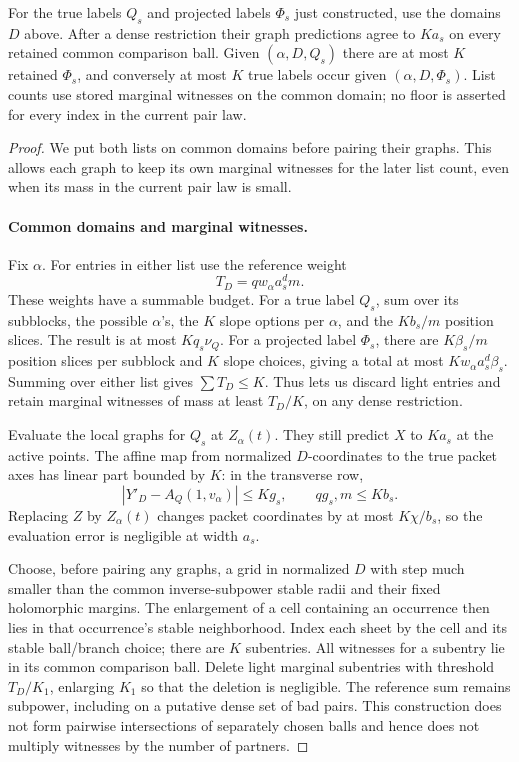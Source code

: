 \begin{lemma}\label{a06:projected-comparison}
For the true labels \(Q_s\) and projected labels \(\Phi_s\)
just constructed, use the domains \(D\) above.
After a dense restriction their graph predictions agree to \(K a_s\)
on every retained common comparison ball.  Given \((\alpha,D,Q_s)\)
there are at most \(K\) retained \(\Phi_s\), and conversely at most
\(K\) true labels occur given \((\alpha,D,\Phi_s)\).
List counts use stored marginal witnesses on the common domain;
no floor is asserted for every index in the current pair law.
\end{lemma}
\begin{proof}
We put both lists on common domains before pairing their graphs.  This
allows each graph to keep its own marginal witnesses for the later list
count, even when its mass in the current pair law is small.

\paragraph{Common domains and marginal witnesses.}
Fix \(\alpha\).  For entries in either list use the reference weight
\[
 T_D=q w_\alpha a_s^d m.
\]
These weights have a summable budget.  For a true label \(Q_s\),
sum over its subblocks, the possible \(\alpha\)'s, the \(K\)
slope options per \(\alpha\), and the \(K b_s/m\) position slices.
The result is at most \(Kq_s\nu_Q\).  For a projected label
\(\Phi_s\), there are \(K\beta_s/m\) position slices per
subblock and \(K\) slope choices, giving a total at most
\(K w_\alpha a_s^d\beta_s\).  Summing over either list gives
\(\sum T_D\le K\).  Thus  lets us
discard light entries and retain marginal witnesses of mass at least
\(T_D/K\), on any dense restriction.

Evaluate the local graphs for \(Q_s\) at \(Z_\alpha(t)\).
They still predict \(X\) to \(Ka_s\) at the active points.
The affine map from normalized \(D\)-coordinates to the true packet
axes has linear part bounded by \(K\): in the transverse row,
\[
 |Y'_D-A_Q(1,v_\alpha)|\le Kg_s,\qquad qg_s,m\le Kb_s.
\]
Replacing \(Z\) by \(Z_\alpha(t)\) changes packet coordinates
by at most \(K\chi/b_s\), so the evaluation error is negligible
at width \(a_s\).

Choose, before pairing any graphs, a grid in normalized \(D\)
with step much smaller than the common inverse-subpower stable
radii and their fixed holomorphic margins.  The enlargement of a
cell containing an occurrence then lies in that occurrence's stable
neighborhood.  Index each sheet by the cell and its stable
ball/branch choice; there are \(K\) subentries.  All witnesses
for a subentry lie in its common comparison ball.  Delete light
marginal subentries with threshold \(T_D/K_1\), enlarging \(K_1\)
so that the deletion is negligible.  The reference sum remains
subpower, including on a putative dense set of bad pairs.
This construction does not form pairwise intersections of
separately chosen balls and hence does not multiply witnesses by
the number of partners.


\end{proof}
